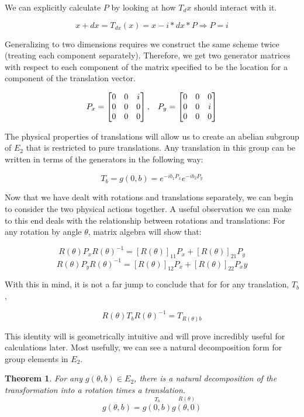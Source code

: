 \documentclass[10pt]{ucthesis}
\newtheorem{theorem}[definition]{Theorem}
\begin{document}
We can explicitly calculate $P$ by looking at how $T_dx$ should interact with it.

$$x + dx = T_{dx}(x) = x -i*dx * P \Rightarrow P = i$$

Generalizing to two dimensions requires we construct the same scheme twice (treating each component separately). Therefore, we get two generator matrices with respect to each component of the matrix specified to be the location for a component of the translation vector.

$$P_x = \begin{bmatrix}
			0 & 0 & i\\
			0 & 0 & 0 \\
			0 & 0 & 0
		\end{bmatrix}, \hspace{3mm}P_y = \begin{bmatrix}
			0 & 0 & 0\\
			0 & 0 & i \\
			0 & 0 & 0
		\end{bmatrix}$$

The physical properties of translations will allow us to create an abelian subgroup of $E_2$ that is restricted to pure translations. Any translation in this group can be written in terms of the generators in the following way:

$$T_b = g(0,b) = e^{-ib_1P_x}e^{-ib_2P_y}$$

Now that we have dealt with rotations and translations separately, we can begin to consider the two physical actions together. A useful observation we can make to this end deals with the relationship between rotations and translations: For any rotation by angle $\theta$, matrix algebra will show that:

$$R(\theta)P_xR(\theta)^{-1} = [R(\theta)]_{11}P_x +  [R(\theta)]_{21}P_y$$
$$R(\theta)P_yR(\theta)^{-1} = [R(\theta)]_{12}P_x +  [R(\theta)]_{22}P_xy$$

With this in mind, it is not a far jump to conclude that for for any translation, $T_b$,

$$R(\theta)T_bR(\theta)^{-1} = T_{R(\theta)b}$$

This identity will is geometrically intuitive and will prove incredibly useful for calculations later. Most usefully, we can see a natural decomposition form for group elements in $E_2$.

\begin{theorem}
	For any $g(\theta,b)\in E_2$, there is a natural decomposition of the transformation into a rotation times a translation.
$$g(\theta,b) = \overset{T_b}{g(0,b)}\overset{R(\theta)}{g(\theta,0)}$$
\end{theorem}
\end{document}
